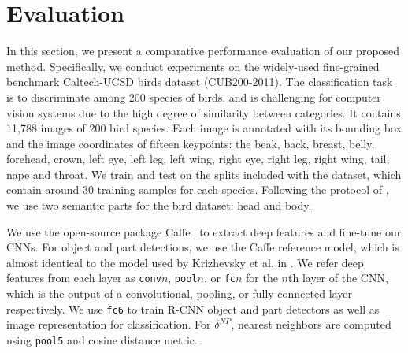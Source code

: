 \section{Evaluation}
In this section, we present a comparative performance evaluation of our proposed method.
Specifically, we conduct experiments on the widely-used fine-grained benchmark Caltech-UCSD birds dataset \cite{DatasetCUB200} (CUB200-2011).
The classification task is to discriminate among 200 species of birds, and is challenging for computer vision systems due to the high degree of similarity between categories.
It contains 11,788 images of 200 bird species. Each image is annotated with its bounding box and the image coordinates of fifteen keypoints: the beak, back, breast, belly, forehead, crown, left eye, left leg, left wing, right eye, right leg, right wing, tail, nape and throat. We train and test on the splits included with the dataset, which contain around 30 training samples for each species.
Following the protocol of \cite{dpd}, we use two semantic parts for the bird dataset: head and body.

We use the open-source package Caffe~\cite{Jia13caffe} to extract deep features and fine-tune our CNNs. For object and part detections, we use the Caffe reference model, which is almost identical to the model used by Krizhevsky et al. in \cite{krizhevsky}. We refer deep features from each layer as \texttt{conv}$n$, \texttt{pool}$n$, or \texttt{fc}$n$ for the $n$th layer of the CNN, which is the output of a convolutional,
pooling, or fully connected layer respectively.
We use \texttt{fc6} to train R-CNN object and part detectors as well as image representation for classification.
For $\delta^{NP}$, nearest neighbors are computed using \texttt{pool5}  and cosine distance metric.


